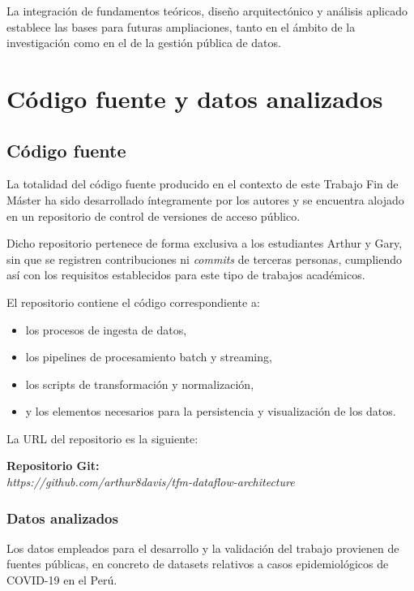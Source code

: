 \documentclass[12pt,a4paper]{article}
\providecommand{\tightlist}{%
  \setlength{\itemsep}{0pt}\setlength{\parskip}{0pt}}
\begin{document}
La integración de fundamentos teóricos, diseño arquitectónico y análisis aplicado establece las bases para futuras ampliaciones, tanto en el ámbito de la investigación como en el de la gestión pública de datos.

\clearpage
\section{Código fuente y datos analizados}\label{cuxf3digo-fuente-y-datos-analizados}


\subsection{Código fuente}\label{cuxf3digo-fuente}

La totalidad del código fuente producido en el contexto de este Trabajo Fin de Máster ha sido desarrollado íntegramente por los autores y se encuentra alojado en un repositorio de control de versiones de acceso público.

Dicho repositorio pertenece de forma exclusiva a los estudiantes Arthur y Gary, sin que se registren contribuciones ni \emph{commits} de terceras personas, cumpliendo así con los requisitos establecidos para este tipo de trabajos académicos.

El repositorio contiene el código correspondiente a:

\begin{itemize}
    \tightlist
    \item
          los procesos de ingesta de datos,
    \item
          los pipelines de procesamiento batch y streaming,
    \item
          los scripts de transformación y normalización,
    \item
          y los elementos necesarios para la persistencia y visualización de los datos.
\end{itemize}

La URL del repositorio es la siguiente:

\textbf{Repositorio Git:\\
} \emph{https://github.com/arthur8davis/tfm-dataflow-architecture}

\subsubsection{Datos analizados}\label{datos-analizados}

Los datos empleados para el desarrollo y la validación del trabajo provienen de fuentes públicas, en concreto de datasets relativos a casos epidemiológicos de COVID-19 en el Perú.
\end{document}
